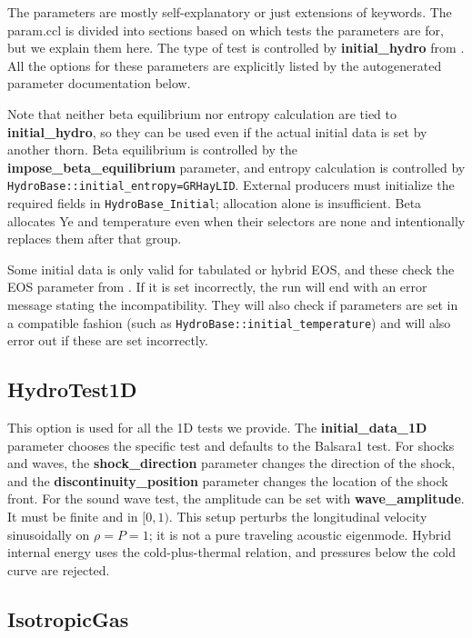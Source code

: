 \documentclass{article}
\begin{document}
The parameters are mostly self-explanatory or just extensions of
\hbase{} keywords. The param.ccl is divided into sections based
on which tests the parameters are for, but we explain them here.
The type of test is controlled by \textbf{initial\_hydro} from
\hbase. All the options for these parameters are explicitly
listed by the autogenerated parameter documentation below.

Note that neither beta equilibrium nor entropy calculation are
tied to \textbf{initial\_hydro}, so they can be used even if
the actual initial data is set by another thorn. Beta equilibrium
is controlled by the \textbf{impose\_beta\_equilibrium} parameter,
and entropy calculation is controlled by
\texttt{HydroBase::initial\_entropy=GRHayLID}. External producers must initialize
the required fields in \texttt{HydroBase\_Initial}; allocation alone is insufficient.
Beta allocates Ye and temperature even when their selectors are none and
intentionally replaces them after that group.

Some initial data is only valid for tabulated or hybrid EOS, and
these check the EOS parameter from \glib. If it is set incorrectly,
the run will end with an error message stating the incompatibility.
They will also check if \hbase{} parameters are set in a compatible
fashion (such as \texttt{HydroBase::initial\_temperature}) and
will also error out if these are set incorrectly.

\subsection{HydroTest1D}

This option is used for all the 1D tests we provide. The
\textbf{initial\_data\_1D} parameter chooses the
specific test and defaults to the Balsara1 test. For shocks and
waves, the \textbf{shock\_direction} parameter changes the
direction of the shock, and the \textbf{discontinuity\_position}
parameter changes the location of the shock front. For the sound
wave test, the amplitude can be set with \textbf{wave\_amplitude}. It must
be finite and in $[0,1)$. This setup perturbs the longitudinal velocity
sinusoidally on $\rho=P=1$; it is not a pure traveling acoustic eigenmode.
Hybrid internal energy uses the cold-plus-thermal relation, and pressures
below the cold curve are rejected.

\subsection{IsotropicGas}
\end{document}
